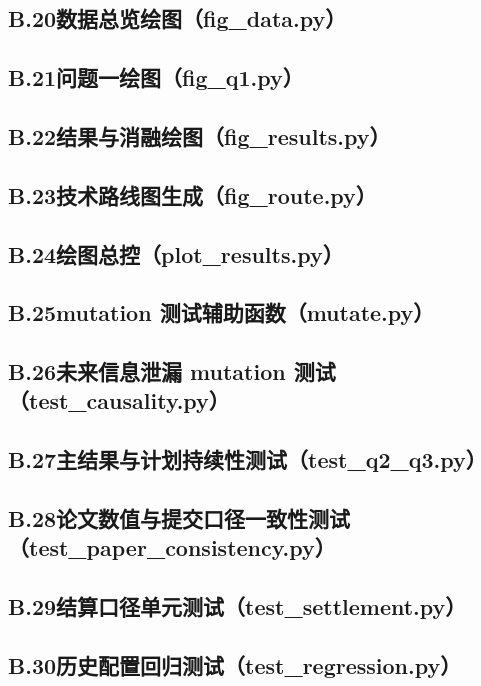 \subsection*{B.20\quad 数据总览绘图（fig\_data.py）}


\subsection*{B.21\quad 问题一绘图（fig\_q1.py）}


\subsection*{B.22\quad 结果与消融绘图（fig\_results.py）}


\subsection*{B.23\quad 技术路线图生成（fig\_route.py）}


\subsection*{B.24\quad 绘图总控（plot\_results.py）}


\subsection*{B.25\quad mutation 测试辅助函数（mutate.py）}


\subsection*{B.26\quad 未来信息泄漏 mutation 测试（test\_causality.py）}


\subsection*{B.27\quad 主结果与计划持续性测试（test\_q2\_q3.py）}


\subsection*{B.28\quad 论文数值与提交口径一致性测试（test\_paper\_consistency.py）}


\subsection*{B.29\quad 结算口径单元测试（test\_settlement.py）}


\subsection*{B.30\quad 历史配置回归测试（test\_regression.py）}

